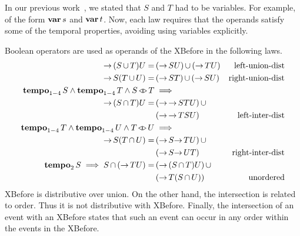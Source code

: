 \documentclass[en,twoside,onehalfspacing,phd]{risethesis}
\def\varop{\ensuremath\operatorname{\mathbf{var}}}
\newcommand{\var}[1]{\ensuremath\varop #1}
\def\xbeforeop{\ensuremath\rightarrow}
\newcommand{\xbefore}[2]{\ensuremath #1 \xbeforeop #2 }
\def\tempoop{\ensuremath\operatorname{\mathbf{tempo}}}
\newcommand{\tempo}[2][1-4]{\ensuremath\tempoop_{#1} #2}
\def\independenteventsop{\ensuremath\operatorname{\triangleleft\triangleright}}
\newcommand{\independentevents}[2]{\ensuremath #1 \independenteventsop #2}
\newcommand{\parsin}[1]{\ensuremath\left( #1 \right)}
\def\union{\ensuremath\operatorname{\cup}}
\def\inter{\ensuremath\operatorname{\cap}}
\def\xbefore{\ensuremath\operatorname{\rightarrow}}
\begin{document}
In our previous work~\cite{DM2015}, we stated that $S$ and $T$ had to be variables.
For example, of the form $\var{s}$ and $\var{t}$.
Now, each law requires that the operands satisfy some of the temporal properties, avoiding using variables explicitly.

Boolean operators are used as operands of the XBefore in the following laws.
%
\begin{subequations}
\begin{align}
\xbefore{\left(S \union T\right)}{U} =&
  \parsin{\xbefore{S}{U}} \union \parsin{\xbefore{T}{U}} &
  \text{left-union-dist}
  \label{thm:xbefore-sup-1}\\
%
\xbefore{S}{\left(T \union U\right)} =&
  \parsin{\xbefore{S}{T}} \union \parsin{\xbefore{S}{U}} &
  \text{right-union-dist}
  \label{thm:xbefore-sup-2}\\
%
\tempo{S} \land \tempo{T} \land \independentevents{S}{T} & \implies\nonumber \\
  \xbefore{\left(S \inter T\right)}{U} =&
  \parsin{\xbefore{\xbefore{S}{T}}{U}} \union \nonumber\\
  &\parsin{\xbefore{\xbefore{T}{S}}{U}} &
  \text{left-inter-dist}
  \label{thm:xbefore-inf-1}\\
%
\tempo{T} \land \tempo{U} \land \independentevents{T}{U} & \implies \nonumber\\
  \xbefore{S}{\left(T \inter U\right)} =&
  \parsin{\xbefore{S}{\xbefore{T}{U}}} \union \nonumber\\
  &\parsin{\xbefore{S}{\xbefore{U}{T}}} &
  \text{right-inter-dist}
  \label{thm:xbefore-inf-2}\\
%
\tempo[2]{S} \implies S \inter \parsin{\xbefore{T}{U}} =&
  \parsin{\xbefore{\parsin{S \inter T}}{U}} \union \nonumber\\
  &\parsin{\xbefore{T}{\parsin{S \inter U}}} &
  \text{unordered}
  \label{thm:and_xbefore_equiv_or_xbefore}
\end{align}
\end{subequations}
%
XBefore is distributive over union.
On the other hand, the intersection is related to order.
Thus it is not distributive with XBefore.
Finally, the intersection of an event with an XBefore states that such an event can occur in any order within the events in the XBefore.
\end{document}
